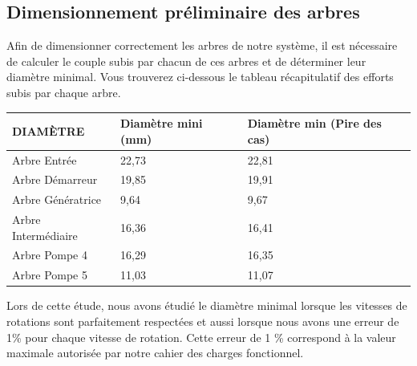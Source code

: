 \documentclass{config}
\begin{document}
\begin{spacing}{1.2}
\begin{table}[h]
\centering
{}
\end{table}

\subsection{Dimensionnement préliminaire des arbres}
Afin de dimensionner correctement les arbres de notre système, il est nécessaire de calculer le couple subis par chacun de ces arbres et de déterminer leur diamètre minimal. Vous trouverez ci-dessous le tableau récapitulatif des efforts subis par chaque arbre.

\begin{table}[h]
\centering
\begin{tabular}{|l|l|l|}
\hline
DIAMÈTRE & Diamètre mini (mm) & Diamètre min (Pire des cas) \\ \hline
Arbre Entrée & 22,73 & 22,81 \\ \hline
Arbre Démarreur & 19,85 & 19,91 \\ \hline
Arbre Génératrice & 9,64 & 9,67 \\ \hline
Arbre Intermédiaire & 16,36 & 16,41 \\ \hline
Arbre Pompe 4 & 16,29 & 16,35 \\ \hline
Arbre Pompe 5 & 11,03 & 11,07 \\ \hline
\end{tabular}
\end{table}

Lors de cette étude, nous avons étudié le diamètre minimal lorsque les vitesses de rotations sont parfaitement respectées et aussi lorsque nous avons une erreur de 1\% pour chaque vitesse de rotation. Cette erreur de 1 \% correspond à la valeur maximale autorisée par notre cahier des charges fonctionnel.


\end{spacing}
\end{document}
